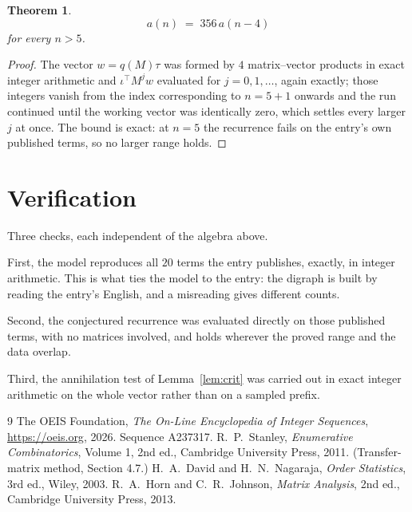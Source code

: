 \documentclass[11pt,a4paper]{article}
\theoremstyle{plain}
\newtheorem{theorem}{Theorem}
\theoremstyle{definition}
\begin{document}
\begin{theorem}
\[
a(n)\;=\;356\,a(n-4)
\]
for every $n>5$.
\end{theorem}

\begin{proof}
The vector $w=q(M)\tau$ was formed by $4$ matrix--vector products in exact integer
arithmetic and $\iota^{\!\top}M^{j}w$ evaluated for $j=0,1,\dots$, again exactly; those
integers vanish from the index corresponding to $n=5+1$ onwards and the run continued
until the working vector was identically zero, which settles every larger $j$ at once. The bound is exact: at $n=5$ the recurrence fails on the entry's own published terms, so no larger range holds.
\end{proof}

\section{Verification}

Three checks, each independent of the algebra above.

First, the model reproduces all $20$ terms the entry publishes, exactly, in integer
arithmetic. This is what ties the model to the entry: the digraph is built by reading the
entry's English, and a misreading gives different counts.

Second, the conjectured recurrence was evaluated directly on those published terms, with no
matrices involved, and holds wherever the proved range and the data overlap.

Third, the annihilation test of Lemma~\ref{lem:crit} was carried out in exact integer
arithmetic on the whole vector rather than on a sampled prefix.

\begin{thebibliography}{9}
 The OEIS Foundation, \emph{The On-Line Encyclopedia of Integer
Sequences}, \url{https://oeis.org}, 2026. Sequence A237317.
 R.~P.~Stanley, \emph{Enumerative Combinatorics}, Volume 1, 2nd ed.,
Cambridge University Press, 2011. (Transfer-matrix method, Section 4.7.)
 H.~A.~David and H.~N.~Nagaraja, \emph{Order Statistics}, 3rd ed., Wiley,
2003.
 R.~A.~Horn and C.~R.~Johnson, \emph{Matrix Analysis}, 2nd ed., Cambridge
University Press, 2013.
\end{thebibliography}
\end{document}
